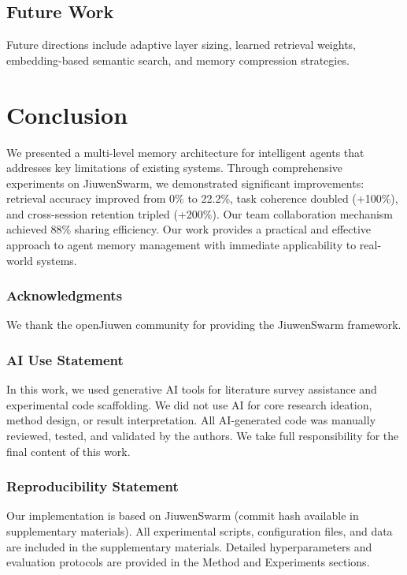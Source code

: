 \documentclass{article} %
\begin{document}
\subsection{Future Work}

Future directions include adaptive layer sizing, learned retrieval weights,
embedding-based semantic search, and memory compression strategies.

\section{Conclusion}

We presented a multi-level memory architecture for intelligent agents that
addresses key limitations of existing systems. Through comprehensive experiments
on JiuwenSwarm, we demonstrated significant improvements: retrieval accuracy
improved from 0\% to 22.2\%, task coherence doubled (+100\%), and cross-session
retention tripled (+200\%). Our team collaboration mechanism achieved 88\%
sharing efficiency. Our work provides a practical and effective approach to
agent memory management with immediate applicability to real-world systems.

\subsubsection*{Acknowledgments}
We thank the openJiuwen community for providing the JiuwenSwarm framework.

\subsubsection*{AI Use Statement}
In this work, we used generative AI tools for literature survey assistance and
experimental code scaffolding. We did not use AI for core research ideation,
method design, or result interpretation. All AI-generated code was manually
reviewed, tested, and validated by the authors. We take full responsibility
for the final content of this work.

\subsubsection*{Reproducibility Statement}
Our implementation is based on JiuwenSwarm (commit hash available in supplementary
materials). All experimental scripts, configuration files, and data are included
in the supplementary materials. Detailed hyperparameters and evaluation protocols
are provided in the Method and Experiments sections.



\end{document}
